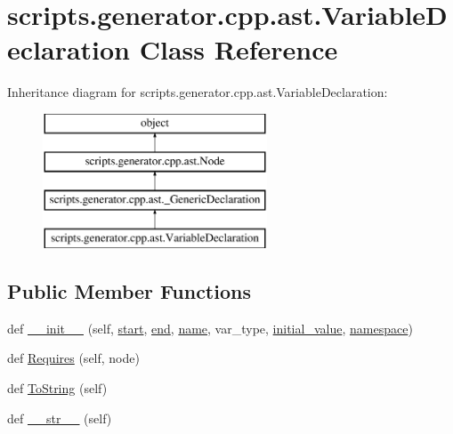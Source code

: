 \hypertarget{classscripts_1_1generator_1_1cpp_1_1ast_1_1_variable_declaration}{}\section{scripts.\+generator.\+cpp.\+ast.\+Variable\+Declaration Class Reference}
\label{classscripts_1_1generator_1_1cpp_1_1ast_1_1_variable_declaration}
Inheritance diagram for scripts.\+generator.\+cpp.\+ast.\+Variable\+Declaration\+:\begin{figure}[H]
\begin{center}
\leavevmode
\includegraphics[height=4.000000cm]{d2/d69/classscripts_1_1generator_1_1cpp_1_1ast_1_1_variable_declaration}
\end{center}
\end{figure}
\subsection*{Public Member Functions}
\begin{DoxyCompactItemize}
\item 
def \mbox{\hyperlink{classscripts_1_1generator_1_1cpp_1_1ast_1_1_variable_declaration_af49fb5941fcdee8afbb5ce7580519610}{\+\_\+\+\_\+init\+\_\+\+\_\+}} (self, \mbox{\hyperlink{classscripts_1_1generator_1_1cpp_1_1ast_1_1_node_a27ce0a583baee598b75ac6dd21f8575b}{start}}, \mbox{\hyperlink{classscripts_1_1generator_1_1cpp_1_1ast_1_1_node_a8e3394f9dd405352610ff9be4f284e2c}{end}}, \mbox{\hyperlink{classscripts_1_1generator_1_1cpp_1_1ast_1_1___generic_declaration_a7cc4e9a1dace9c627d7fe4ce614a8888}{name}}, var\+\_\+type, \mbox{\hyperlink{classscripts_1_1generator_1_1cpp_1_1ast_1_1_variable_declaration_aa79935e3c703c4cf5a542c1c7cf7a6a8}{initial\+\_\+value}}, \mbox{\hyperlink{classscripts_1_1generator_1_1cpp_1_1ast_1_1___generic_declaration_a6e7fb8f951551af19f2366876a150817}{namespace}})
\item 
def \mbox{\hyperlink{classscripts_1_1generator_1_1cpp_1_1ast_1_1_variable_declaration_ab09d4cce8b643aef4b7ac1e4499c1cc2}{Requires}} (self, node)
\item 
def \mbox{\hyperlink{classscripts_1_1generator_1_1cpp_1_1ast_1_1_variable_declaration_adedf3c3740f8f3d8e018516b1249e22a}{To\+String}} (self)
\item 
def \mbox{\hyperlink{classscripts_1_1generator_1_1cpp_1_1ast_1_1_variable_declaration_a6cfba922c97fcb4673bcb2478b8c3a90}{\+\_\+\+\_\+str\+\_\+\+\_\+}} (self)
\end{DoxyCompactItemize}
